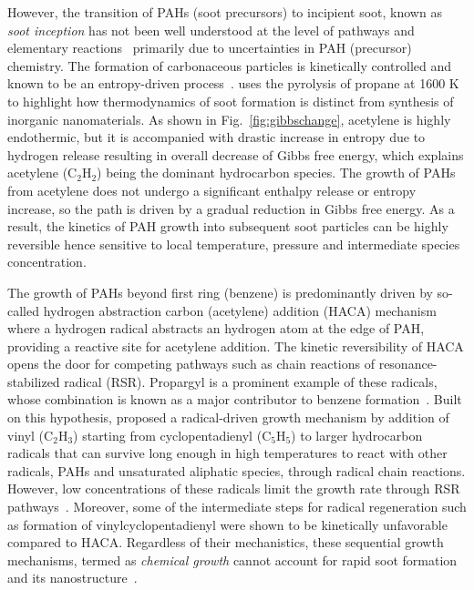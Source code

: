 However, the transition of PAHs (soot precursors) to incipient soot, known as \textit{soot inception} has not been well understood at the level of pathways and elementary reactions~\cite{Wang2011} primarily due to uncertainties in PAH (precursor) chemistry. The formation of carbonaceous particles is kinetically controlled and known to be an entropy-driven process~\cite{Wang2011}. \citet{Wang2011} uses the pyrolysis of propane at 1600 K to highlight how thermodynamics of soot formation is distinct from synthesis of inorganic nanomaterials. As shown in Fig.~\ref{fig:gibbschange}, acetylene is highly endothermic, but it is accompanied with drastic increase in entropy due to hydrogen release resulting in overall decrease of Gibbs free energy, which explains acetylene ($\mathrm{C_2H_2}$) being the dominant hydrocarbon species. The growth of PAHs from acetylene does not undergo a significant enthalpy release or entropy increase, so the path is driven by a gradual reduction in Gibbs free energy. As a result, the kinetics of PAH growth into 
subsequent soot particles can be highly reversible hence sensitive to local temperature, pressure and intermediate species concentration.

The growth of PAHs beyond first ring (benzene) is predominantly driven by so-called hydrogen abstraction carbon (acetylene) addition (HACA) mechanism~\citep{frenklach2002reaction} where a hydrogen radical abstracts an hydrogen atom at the edge of PAH, providing a reactive site for acetylene addition. The kinetic reversibility of HACA opens the door for competing pathways such as chain reactions of resonance-stabilized radical (RSR). Propargyl is a prominent example of these radicals, whose combination is known as a major contributor to benzene formation~\citep{fahr1989reactions}. Built on this hypothesis, \citet{johansson2018resonance} proposed a radical-driven growth mechanism by addition of vinyl ($\mathrm{C_2H_3}$) starting from cyclopentadienyl ($\mathrm{C_5H_5}$) to larger hydrocarbon radicals that can survive long enough in high temperatures to react with other radicals, PAHs and unsaturated aliphatic species,
through radical chain reactions. However, low concentrations of these radicals limit the growth rate through RSR pathways~\citep{frenklach2020mechanism}. Moreover, some of the intermediate steps for radical regeneration such as formation of vinylcyclopentadienyl were shown to be kinetically unfavorable~\citep{frenklach2020mechanism} compared to HACA. Regardless of their mechanistics, these sequential growth mechanisms, termed as \textit{chemical growth} cannot account for rapid soot formation~\citep{frenklach2002reaction} and its nanostructure~\citep{frenklach1988comment}.

